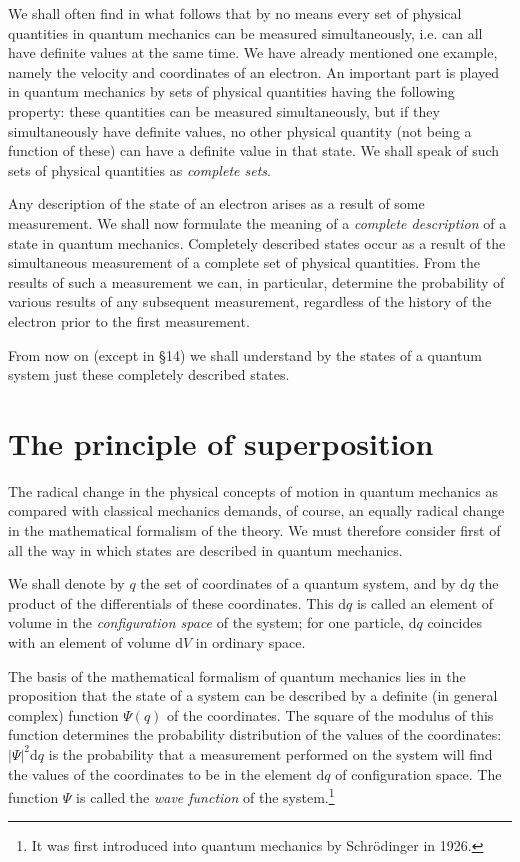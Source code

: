 We shall often find in what follows that by no means every set of physical quantities in quantum mechanics can be measured simultaneously, i.e. can all have definite values at the same time. We have already mentioned one example, namely the velocity and coordinates of an electron. An important part is played in quantum mechanics by sets of physical quantities having the following property: these quantities can be measured simultaneously, but if they simultaneously have definite values, no other physical quantity (not being a function of these) can have a definite value in that state. We shall speak of such sets of physical quantities as \textit{complete sets}.


Any description of the state of an electron arises as a result of some measurement. We shall now formulate the meaning of a \textit{complete description} of a state in quantum mechanics. Completely described states occur as a result of the simultaneous measurement of a complete set of physical quantities. From the results of such a measurement we can, in particular, determine the probability of various results of any subsequent measurement, regardless of the history of the electron prior to the first measurement.


From now on (except in §14) we shall understand by the states of a quantum system just these completely described states.
\section{The principle of superposition}\label{The principle of superposition}
The radical change in the physical concepts of motion in quantum mechanics as compared with classical mechanics demands, of course, an equally radical change in the mathematical formalism of the theory. We must therefore consider first of all the way in which states are described in quantum mechanics.


We shall denote by $ q $ the set of coordinates of a quantum system, and by $ \mathrm{d}q $ the product of the differentials of these coordinates. This $ \mathrm{d}q $ is called an element of volume in the \textit{configuration space} of the system; for one particle, $ \mathrm{d}q $ coincides with an element of volume $ \mathrm{d}V $ in ordinary space.


The basis of the mathematical formalism of quantum mechanics lies in the proposition that the state of a system can be described by a definite (in general complex) function $ \Psi(q) $ of the coordinates. The square of the modulus of this function determines the probability distribution of the values of the coordinates: $ |\Psi|^2\mathrm{d}q $ is the probability that a measurement performed on the system will find the values of the coordinates to be in the element $ \mathrm{d}q $ of configuration space. The function $ \Psi $ is called the \textit{wave function} of the system.\footnote{It was first introduced into quantum mechanics by Schrödinger in 1926.}


